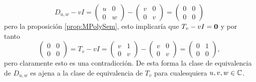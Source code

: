 \[
  D_{u,w} - vI = \begin{pmatrix} u & 0 \\ 0 & w \end{pmatrix} - \begin{pmatrix} v & 0 \\ 0 & v \end{pmatrix}
  = \begin{pmatrix} 0 & 0 \\ 0 & 0 \end{pmatrix}
\]
pero la proposición \ref{prop:MPolySem}, esto implicaría que $T_v - vI  = \mathbf{0}$ y por tanto
\[
  \begin{pmatrix} 0 & 0 \\ 0 & 0 \end{pmatrix} = T_v - vI = \begin{pmatrix} v & 1 \\ 0 & v \end{pmatrix} - \begin{pmatrix} v & 0 \\ 0 & v \end{pmatrix} = \begin{pmatrix}
    0 & 1 \\ 0 & 0 \end{pmatrix},
\]
pero claramente esto es una contradicción. De esta forma la clase de equivalencia de $D_{u,w}$ es ajena a la clase de equivalencia de $T_v$ para cualesquiera $u,v,w \in \mathbb{C}$.